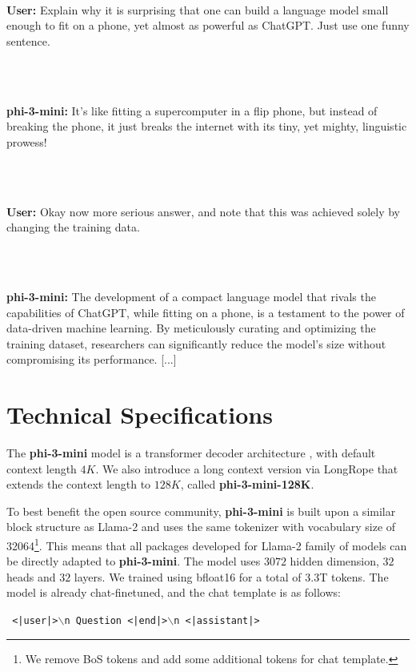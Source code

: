 \documentclass[11pt]{article}
\begin{document}
\begin{AIbox}{}
\tt \footnotesize 
\begin{minipage}[t]{0.99\linewidth}
\textbf{User:} Explain why it is surprising that one can build a language model small enough to fit on a phone, yet almost as powerful as ChatGPT. Just use one funny sentence.
\end{minipage}
\\ \\
\begin{minipage}[t]{0.99\linewidth}
\textbf{phi-3-mini:} It's like fitting a supercomputer in a flip phone, but instead of breaking the phone, it just breaks the internet with its tiny, yet mighty, linguistic prowess!
\end{minipage}
\\ \\
\begin{minipage}[t]{0.99\linewidth}
\textbf{User:}  Okay now more serious answer, and note that this was achieved solely by changing the training data.
\end{minipage}
\\ \\
\begin{minipage}[t]{0.99\linewidth}
\textbf{phi-3-mini:} The development of a compact language model that rivals the capabilities of ChatGPT, while fitting on a phone, is a testament to the power of data-driven machine learning. By meticulously curating and optimizing the training dataset, researchers can significantly reduce the model's size without compromising its performance. [...]
\end{minipage}
\end{AIbox}


\section{Technical Specifications}
The \textbf{phi-3-mini} model is a transformer decoder architecture \cite{Vas17}, with default context length $4K$. We also introduce a long context version via LongRope \cite{ding2024longrope} that extends the context length to $128K$, called \textbf{phi-3-mini-128K}. 

To best benefit the open source community, \textbf{phi-3-mini} is built upon a similar block structure as Llama-2 \cite{touvron2023llama} and uses the same tokenizer with vocabulary size of 32064\footnote{We remove BoS tokens and add some additional tokens for chat template.}. {This means that all packages developed for Llama-2 family of models can be directly adapted to \textbf{phi-3-mini}}. The model uses $3072$ hidden dimension, $32$ heads and $32$ layers. We trained using bfloat16 for a total of 3.3T tokens. The model is already chat-finetuned, and the chat template is as follows:
\begin{AIbox}{}
\tt \footnotesize 
<|user|>$\backslash$n
Question
<|end|>$\backslash$n
<|assistant|>
\end{AIbox}
\end{document}

